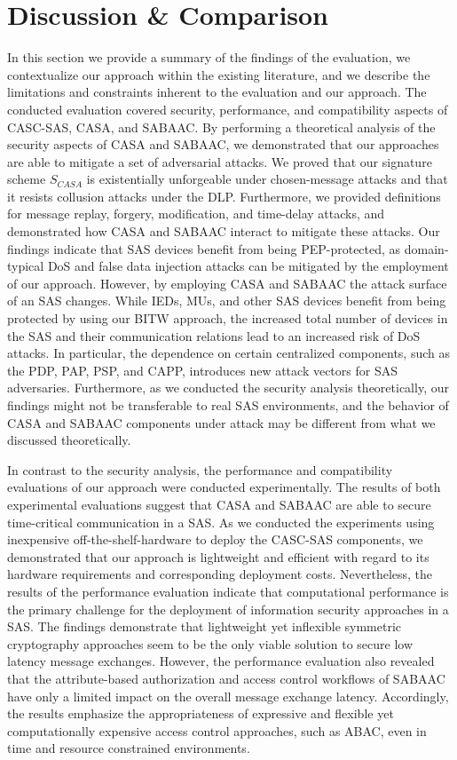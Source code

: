 \section{Discussion \& Comparison}
In this section we provide a summary of the findings of the evaluation, we contextualize our approach within the existing literature, and we describe the limitations and constraints inherent to the evaluation and our approach.
The conducted evaluation covered security, performance, and compatibility aspects of CASC-SAS, CASA, and SABAAC.
By performing a theoretical analysis of the security aspects of CASA and SABAAC, we demonstrated that our approaches are able to mitigate a set of adversarial attacks.
We proved that our signature scheme $S_{CASA}$ is existentially unforgeable under chosen-message attacks and that it resists collusion attacks under the DLP.
Furthermore, we provided definitions for message replay, forgery, modification, and time-delay attacks, and demonstrated how CASA and SABAAC interact to mitigate these attacks.
Our findings indicate that SAS devices benefit from being PEP-protected, as domain-typical DoS and false data injection attacks can be mitigated by the employment of our approach.
However, by employing CASA and SABAAC the attack surface of an SAS changes.
While IEDs, MUs, and other SAS devices benefit from being protected by using our BITW approach, the increased total number of devices in the SAS and their communication relations lead to an increased risk of DoS attacks.
In particular, the dependence on certain centralized components, such as the PDP, PAP, PSP, and CAPP, introduces new attack vectors for SAS adversaries.
Furthermore, as we conducted the security analysis theoretically, our findings might not be transferable to real SAS environments, and the behavior of CASA and SABAAC components under attack may be different from what we discussed theoretically.

In contrast to the security analysis, the performance and compatibility evaluations of our approach were conducted experimentally.
The results of both experimental evaluations suggest that CASA and SABAAC are able to secure time-critical communication in a SAS.
As we conducted the experiments using inexpensive off-the-shelf-hardware to deploy the CASC-SAS components, we demonstrated that our approach is lightweight and efficient with regard to its hardware requirements and corresponding deployment costs.
Nevertheless, the results of the performance evaluation indicate that computational performance is the primary challenge for the deployment of information security approaches in a SAS.
The findings demonstrate that lightweight yet inflexible symmetric cryptography approaches seem to be the only viable solution to secure low latency message exchanges.
However, the performance evaluation also revealed that the attribute-based authorization and access control workflows of SABAAC have only a limited impact on the overall message exchange latency.
Accordingly, the results emphasize the appropriateness of expressive and flexible yet computationally expensive access control approaches, such as ABAC, even in time and resource constrained environments.

